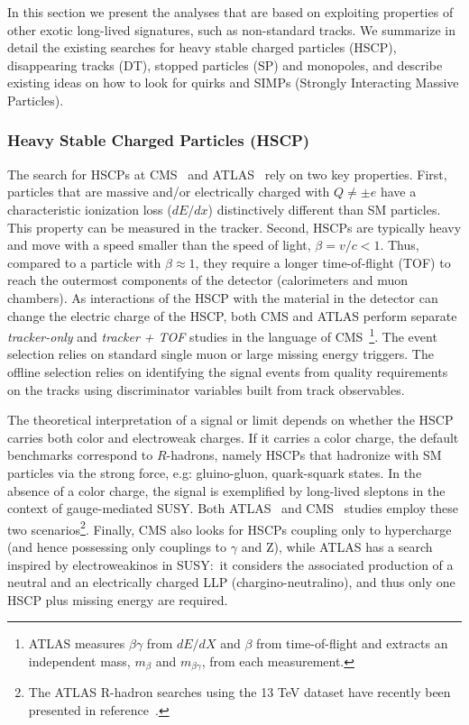 In this section we present the analyses that are based on exploiting properties of other exotic long-lived signatures, such as non-standard tracks.  We summarize in detail the existing searches for heavy stable charged particles (HSCP), disappearing tracks (DT), stopped particles (SP) and monopoles, and describe  existing ideas on how to look for quirks and SIMPs (Strongly Interacting Massive Particles).

\subsubsection{Heavy Stable Charged Particles (HSCP)} 
\label{subsec:ExpHSCP}

The search for HSCPs at CMS~\cite{Chatrchyan:2013oca,CMS:2016ybj} and ATLAS~\cite{ATLAS:2014fka,Aaboud:2016uth} rely on two key properties. First, particles that are massive and/or electrically charged with $Q \ne \pm e$ have a  characteristic ionization loss ($dE/dx$) distinctively different than SM particles. This property can be measured in the tracker.
Second, HSCPs are typically heavy and move with a speed smaller than the speed of light, $\beta = v/c < 1$. Thus, compared to a particle with $\beta \approx 1$, they require a longer time-of-flight (TOF) to reach the outermost components of the detector (calorimeters and muon chambers).  As interactions of the HSCP with the material in the detector can change the electric charge of the HSCP, both CMS and ATLAS perform separate \emph{tracker-only} and \emph{tracker + TOF} studies in the language of CMS~\footnote{ATLAS measures $\beta \gamma$ from $dE/dX$ and $\beta$ from time-of-flight and extracts an independent mass, $m_{\beta}$ and $m_{\beta \gamma}$, from each measurement.}. The event selection relies on standard single muon or large missing energy triggers. The offline selection relies on identifying the signal events from quality requirements on the tracks using discriminator variables built from track observables. 

The theoretical interpretation of a signal or limit depends on whether the HSCP carries both color and electroweak charges. If it carries a color charge, the default benchmarks correspond to $R$-hadrons, namely HSCPs that hadronize with SM particles via the strong force, e.g: gluino-gluon, quark-squark states. In the absence of a color charge, the signal is exemplified by long-lived sleptons in the context of gauge-mediated SUSY. Both ATLAS~\cite{ATLAS:2014fka} and CMS~\cite{CMS:2016ybj} studies employ these two scenarios\footnote{The ATLAS R-hadron searches using the 13 TeV dataset have recently been presented in reference~\cite{Aaboud:2016uth}. }.
Finally, CMS also looks for HSCPs coupling only to hypercharge (and hence possessing only couplings to $\gamma$ and Z), while ATLAS has a search inspired by electroweakinos in SUSY:~it considers the associated production of a neutral and an electrically charged LLP (chargino-neutralino), and thus only one HSCP plus missing energy are required.

